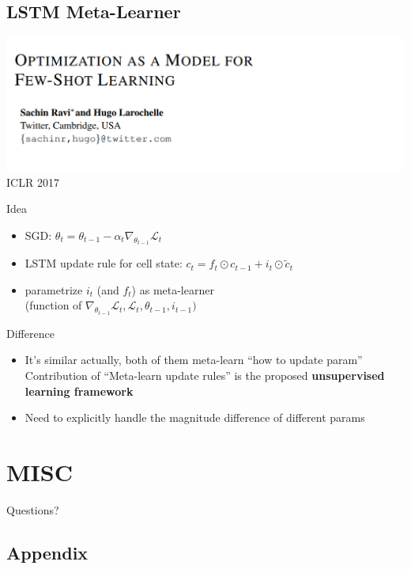 \documentclass{beamer}
\newcommand{\weib}{\CJKfamily{weib}}
\begin{document}
\subsection{LSTM Meta-Learner}
\begin{frame}
  \includegraphics[width=\textwidth]{fig/LSTM-Meta-Learner.png}
  \center ICLR 2017
\end{frame}

\begin{frame}{Idea}
  \begin{itemize}
    \item SGD: $\theta_{t} = \theta_{t-1} - \alpha_t \nabla_{\theta_{t-1}} \mathcal{L}_t$
    \item LSTM update rule for cell state: $c_t = f_t \odot c_{t-1} + i_t \odot \tilde{c}_t$
    \item parametrize $i_t$ (and $f_t$) as meta-learner \\ 
      \quad \quad (function of $\nabla_{\theta_{t-1}}\mathcal{L}_t, \mathcal{L}_t, \theta_{t-1}, i_{t-1})$
  \end{itemize}
\end{frame}

\begin{frame}{Difference}
  \begin{itemize}
    \item It's similar actually, both of them meta-learn ``how to update param''
    \quad \quad Contribution of ``Meta-learn update rules'' is the proposed \textbf{unsupervised learning framework}
    \item Need to explicitly handle the magnitude difference of different params
  \end{itemize}
\end{frame}

\section{MISC}
\begin{frame}
	\begin{center}
    \LARGE{Questions?}
	\end{center}
\end{frame}


\subsection{Appendix}
\end{document}

